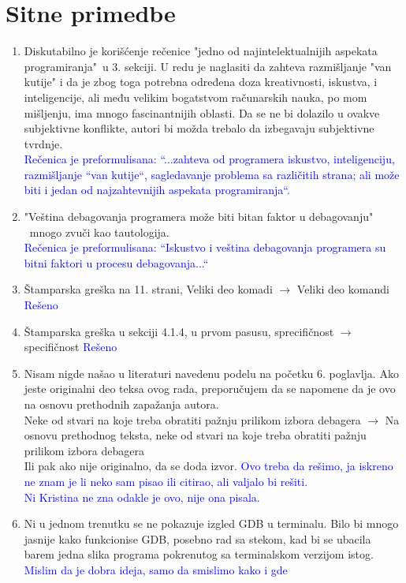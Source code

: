\documentclass[a4paper]{report}
\newcommand{\odgovor}[1]{\textcolor{blue}{#1}}
\begin{document}
\section{Sitne primedbe}
\begin{enumerate}
		
	\item Diskutabilno je korišćenje rečenice "jedno od najintelektualnijih aspekata programiranja"\ u 3. sekciji. U redu je naglasiti da zahteva razmišljanje "van kutije" i da je zbog toga potrebna određena doza kreativnosti, iskustva, i inteligencije, ali među velikim bogatstvom računarskih nauka, po mom mišljenju, ima mnogo fascinantnijih oblasti. Da se ne bi dolazilo u ovakve subjektivne konflikte, autori bi možda trebalo da izbegavaju subjektivne tvrdnje. \\
	\odgovor{Rečenica je preformulisana: ``...zahteva od programera iskustvo, inteligenciju, razmišljanje ``van kutije``, 		sagledavanje problema sa različitih strana; ali može biti i jedan od najzahtevnijih aspekata programiranja``.}
	\item "Veština debagovanja programera može biti bitan faktor u debagovanju" \ mnogo zvuči kao tautologija. \\
	\odgovor{Rečenica je preformulisana: ``Iskustvo i veština debagovanja programera su bitni faktori u procesu debagovanja...``}
	\item Štamparska greška na 11. strani, Veliki deo komadi $\rightarrow$ Veliki deo komandi
	\odgovor{Rešeno}
	\item Štamparska greška u sekciji 4.1.4, u prvom pasusu,  sprecifičnost $\rightarrow$ specifičnost
	\odgovor{Rešeno}
	\item Nisam nigde našao u literaturi navedenu podelu na početku 6. poglavlja. Ako jeste originalni deo teksa ovog rada, preporučujem da se napomene da je ovo na osnovu prethodnih zapažanja autora.
\\
 Neke od stvari na koje treba obratiti pažnju prilikom izbora debagera  $\rightarrow$  Na osnovu prethodnog teksta, neke od stvari na koje treba obratiti pažnju prilikom izbora debagera
\\
Ili pak ako nije originalno, da se doda izvor. 
	\odgovor{Ovo treba da rešimo, ja iskreno ne znam je li neko sam pisao ili citirao, ali valjalo bi rešiti. \\
Ni Kristina ne zna odakle je ovo, nije ona pisala.}
\item Ni u jednom trenutku se ne pokazuje izgled GDB u terminalu. Bilo bi mnogo jasnije kako funkcionise GDB, posebno rad sa stekom, kad bi se ubacila barem 
jedna slika programa pokrenutog sa terminalskom verzijom istog.\\
	\odgovor{Mislim da je dobra ideja, samo da smislimo kako i gde}
\end{enumerate}
\end{document}
